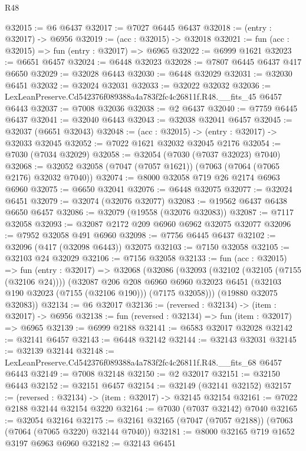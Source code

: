 \begin{lexlean}{R48}
\begin{coremodule}
@32015 := @6 @6437
@32017 := @7027 @6445 @6437
@32018 := (entry : @32017) -> @6956
@32019 := (acc : @32015) -> @32018
@32021 := fun (acc : @32015) => fun (entry : @32017) => @6965
@32022 := @6999 @1621
@32023 := @6651 @6457
@32024 := @6448 @32023
@32028 := @7807 @6445 @6437 @417 @6650
@32029 := @32028 @6443
@32030 := @6448 @32029
@32031 := @32030 @6451
@32032 := @32024 @32031
@32033 := @32022 @32032
@32036 := LexLeanPreserve.Cd542376f089388a4a783f2fc4c26811f.R48.__fits_45 @6457 @6443
@32037 := @7008 @32036
@32038 := @2 @6437
@32040 := @7759 @6445 @6437
@32041 := @32040 @6443
@32043 := @32038 @32041 @6457
@32045 := @32037 (@6651 @32043)
@32048 := (acc : @32015) -> (entry : @32017) -> @32033 @32045
@32052 := @7022 @1621 @32032 @32045 @2176
@32054 := @7030 (@7034 @32029)
@32058 := @32054 (@7030 (@7037 @32023) @7040)
@32068 := @32052 @32058 (@7047 (@7057 @1621)) (@7063 (@7064 (@7065 @2176) @32032 @7040))
@32074 := @8000 @32058 @719 @26 @2174 @6963 @6960
@32075 := @6650 @32041
@32076 := @6448 @32075
@32077 := @32024 @6451
@32079 := @32074 (@32076 @32077)
@32083 := @19562 @6437 @6438 @6650 @6457
@32086 := @32079 (@19558 (@32076 @32083))
@32087 := @7117 @32058
@32093 := @32087 @2172 @209 @6960 @6962 @32075 @32077
@32096 := @7952 @32058 @491 @6960
@32098 := @7756 @6445 @6437
@32102 := @32096 (@417 (@32098 @6443)) @32075
@32103 := @7150 @32058
@32105 := @32103 @24 @32029
@32106 := @7156 @32058
@32133 := fun (acc : @32015) =>
  fun (entry : @32017) =>
  @32068
    (@32086
      (@32093
        (@32102 (@32105 (@7155 (@32106 @24))))
        (@32087
          @206
          @208
          @6960
          @6960
          @32023
          @6451
          (@32103 @190 @32023 (@7155 (@32106 @190)))
          (@7175 @32058)))
      (@19880 @32075 @32083))
@32134 := @6 @32017
@32136 := (reversed : @32134) -> (item : @32017) -> @6956
@32138 := fun (reversed : @32134) => fun (item : @32017) => @6965
@32139 := @6999 @2188
@32141 := @6583 @32017 @32028
@32142 := @32141 @6457
@32143 := @6448 @32142
@32144 := @32143 @32031
@32145 := @32139 @32144
@32148 := LexLeanPreserve.Cd542376f089388a4a783f2fc4c26811f.R48.__fits_68 @6457 @6443
@32149 := @7008 @32148
@32150 := @2 @32017
@32151 := @32150 @6443
@32152 := @32151 @6457
@32154 := @32149 (@32141 @32152)
@32157 := (reversed : @32134) -> (item : @32017) -> @32145 @32154
@32161 := @7022 @2188 @32144 @32154 @3220
@32164 := @7030 (@7037 @32142) @7040
@32165 := @32054 @32164
@32175 := @32161 @32165 (@7047 (@7057 @2188)) (@7063 (@7064 (@7065 @3220) @32144 @7040))
@32181 := @8000 @32165 @719 @1652 @3197 @6963 @6960
@32182 := @32143 @6451

\end{coremodule}
\end{lexlean}
